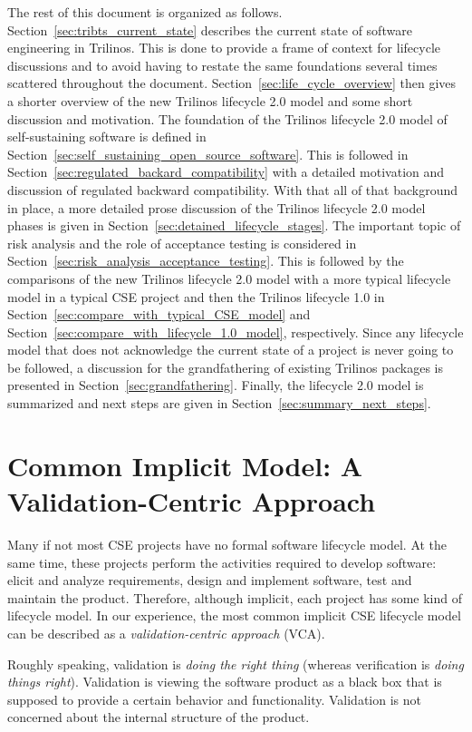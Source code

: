 \documentclass[11pt]{SANDreport}
\begin{document}
The rest of this document is organized as follows.
Section~\ref{sec:tribts_current_state} describes the current state
of software engineering in Trilinos.  This is done to provide a frame
of context for lifecycle discussions and to avoid having to restate
the same foundations several times scattered throughout the document.
Section~\ref{sec:life_cycle_overview} then gives a shorter overview of
the new Trilinos lifecycle 2.0 model and some short discussion and
motivation.  The foundation of the Trilinos lifecycle 2.0 model of
self-sustaining software is defined in
Section~\ref{sec:self_sustaining_open_source_software}.  This is
followed in Section~\ref{sec:regulated_backard_compatibility} with a
detailed motivation and discussion of regulated backward
compatibility.  With that all of that background in place, a more
detailed prose discussion of the Trilinos lifecycle 2.0 model phases
is given in Section~\ref{sec:detained_lifecycle_stages}.  The
important topic of risk analysis and the role of acceptance testing is
considered in Section~\ref{sec:risk_analysis_acceptance_testing}.
This is followed by the comparisons of the new Trilinos lifecycle 2.0
model with a more typical lifecycle model in a typical CSE project and
then the Trilinos lifecycle 1.0 in
Section~\ref{sec:compare_with_typical_CSE_model} and
Section~\ref{sec:compare_with_lifecycle_1.0_model}, respectively.
Since any lifecycle model that does not acknowledge the current state
of a project is never going to be followed, a discussion for the
grandfathering of existing Trilinos packages is presented in
Section~\ref{sec:grandfathering}.  Finally, the lifecycle 2.0 model is
summarized and next steps are given in
Section~\ref{sec:summary_next_steps}.

%
{}\section {Common Implicit Model: A Validation-Centric Approach}
\label{sect:validation_centric_approach}

Many if not most CSE projects have no formal software lifecycle model.  At the same time, these projects perform the activities required to develop software: elicit and analyze requirements, design and implement software, test and maintain the product.  Therefore, although implicit, each project has some kind of lifecycle model.  In our experience, the most common implicit CSE lifecycle model can be described as a {\it validation-centric approach} (VCA).  

Roughly speaking, validation is {\it doing the right thing} (whereas verification is {\it doing things right}).  Validation is viewing the software product as a black box that is supposed to provide a certain behavior and functionality.  Validation is not concerned about the internal structure of the product.
\end{document}
